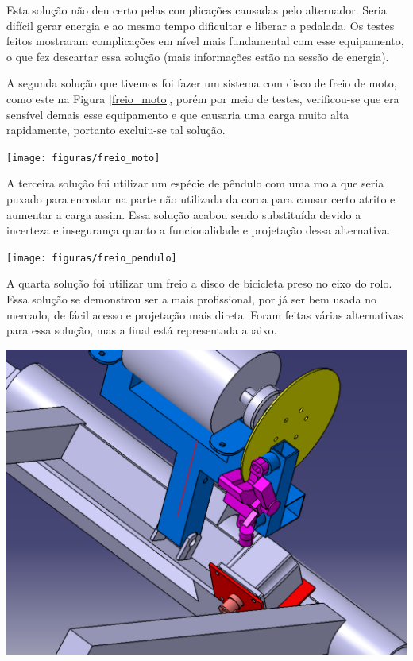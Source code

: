     Esta solução não deu certo pelas complicações causadas pelo alternador. Seria difícil gerar energia e ao mesmo tempo dificultar e liberar a pedalada. Os testes feitos mostraram complicações em nível mais fundamental com esse equipamento, o que fez descartar essa solução (mais informações estão na sessão de energia).

    A segunda solução que tivemos foi fazer um sistema com disco de freio de moto, como este na Figura \ref{freio_moto}, porém por meio de testes, verificou-se que era sensível demais esse equipamento e que causaria uma carga muito alta rapidamente, portanto excluiu-se tal solução.

    \begin{center}
    	\texttt{[image: figuras/freio\_moto]}
        \label{freio_moto}
    \end{center}

    A terceira solução foi utilizar um espécie de pêndulo com uma mola que seria puxado para encostar na parte não utilizada da coroa para causar certo atrito e aumentar a carga assim. Essa solução acabou sendo substituída devido a incerteza e insegurança quanto a funcionalidade e projetação dessa alternativa.

    \begin{center}
    	\texttt{[image: figuras/freio\_pendulo]}
        \label{freio_pendulo}
    \end{center}

    A quarta solução foi utilizar um freio a disco de bicicleta preso no eixo do rolo. Essa solução se demonstrou ser a mais profissional, por já ser bem usada no mercado, de fácil acesso e projetação mais direta. Foram feitas várias alternativas para essa solução, mas a final está representada abaixo.

    \begin{center}
    	\includegraphics[scale=0.5]{figuras/carga_peso}
        \label{carga_peso}
    \end{center}

